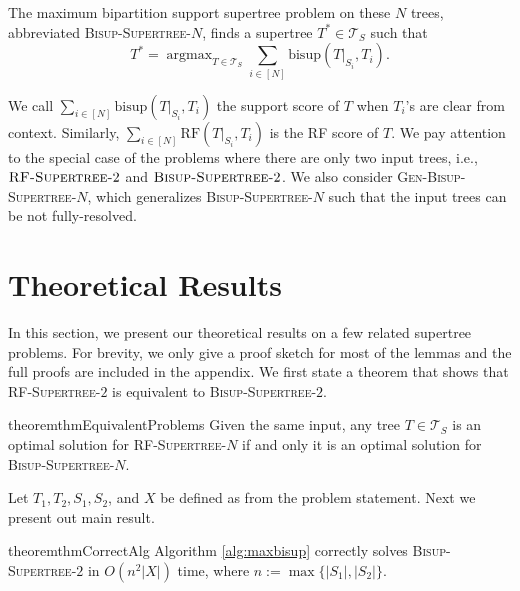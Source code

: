 \documentclass{bmcart}
\newcommand{\bs}{\mathrm{bisup}}
\newcommand{\RF}{\mathrm{RF}}
\newcommand{\bisuptwo}{\textsc{Bisup-Supertree-$2$}\xspace}
\newcommand{\bisupn}{\textsc{Bisup-Supertree-$N$}\xspace}
\newcommand{\genbisup}{\textsc{Gen-Bisup-Supertree-$N$}\xspace}
\newcommand{\rfn}{\textsc{RF-Supertree-$N$}\xspace}
\newcommand{\rftwo}{\textsc{RF-Supertree-$2$}\xspace}
\DeclareMathOperator*{\argmax}{argmax}
\theoremstyle{mystyle}
\theoremstyle{proofstyle}
\begin{document}
The maximum bipartition support supertree problem on these $N$ trees, abbreviated \bisupn, finds a supertree $T^* \in \mathcal{T}_S$ such that
\[T^* = \argmax_{T \in \mathcal{T}_S} \sum_{i \in [N]} \bs(T|_{S_i}, T_i).\]

We call $\sum_{i\in[N]}\bs(T|_{S_i}, T_i)$ the support score of $T$ when $T_i$'s are clear from context. Similarly, $\sum_{i \in [N]} \RF(T|_{S_i}, T_i)$ is the RF score of $T$. We pay attention to the special case of the problems where there are only two input trees, i.e., $\rftwo$ and $\bisuptwo$. We also consider \genbisup, which generalizes \bisupn such that the input trees can be not fully-resolved.



\section{Theoretical Results} \label{sec:theory}

In this section, we present our theoretical results on a few related supertree problems. For brevity, we only give a proof sketch for most of the lemmas and the full proofs are included in the appendix. We first state a theorem that shows that \rftwo is equivalent to \bisuptwo. 

\begin{restatable}{theorem}{thmEquivalentProblems} \label{thm: equivalence_RF_support}
Given the same input, any tree $T \in \mathcal{T}_S$ is an optimal solution for \rfn if and only it is an optimal solution for \bisupn.
\end{restatable}

Let $T_1,T_2,S_1,S_2$, and $X$ be defined as from the problem statement. Next we present out main result.
\begin{restatable}{theorem}{thmCorrectAlg} \label{thm:correctness_alg}
    Algorithm \ref{alg:maxbisup} correctly solves \bisuptwo in $O(n^2|X|)$ time, where $n :=\max\{|S_1|,|S_2|\}$.
\end{restatable}
\end{document}
